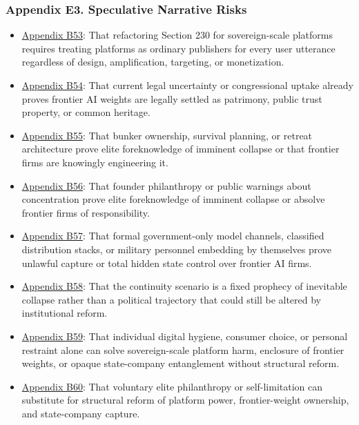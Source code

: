 \documentclass[
  american,
  11pt,
  letterpaper,
]{article}
\providecommand{\tightlist}{%
  \setlength{\itemsep}{0pt}\setlength{\parskip}{0pt}}
\begin{document}
\subsubsection{Appendix E3. Speculative Narrative
Risks}\label{appendix-e3-speculative-narrative-risks}

\begin{itemize}
\tightlist
\item
  \hyperref[appendix-b53-refactoring-section-230-for-sovereign-scale-platforms-requires-treating-platforms]{Appendix
  B53}: That refactoring Section 230 for sovereign-scale platforms
  requires treating platforms as ordinary publishers for every user
  utterance regardless of design, amplification, targeting, or
  monetization.
\item
  \hyperref[appendix-b54-current-legal-uncertainty-or-congressional-uptake-already-proves-frontier-ai-weig]{Appendix
  B54}: That current legal uncertainty or congressional uptake already
  proves frontier AI weights are legally settled as patrimony, public
  trust property, or common heritage.
\item
  \hyperref[appendix-b55-bunker-ownership-survival-planning-or-retreat-architecture-prove-elite-foreknow]{Appendix
  B55}: That bunker ownership, survival planning, or retreat
  architecture prove elite foreknowledge of imminent collapse or that
  frontier firms are knowingly engineering it.
\item
  \hyperref[appendix-b56-founder-philanthropy-or-public-warnings-about-concentration-prove-elite-foreknowl]{Appendix
  B56}: That founder philanthropy or public warnings about concentration
  prove elite foreknowledge of imminent collapse or absolve frontier
  firms of responsibility.
\item
  \hyperref[appendix-b57-formal-government-only-model-channels-classified-distribution-stacks-or-militar]{Appendix
  B57}: That formal government-only model channels, classified
  distribution stacks, or military personnel embedding by themselves
  prove unlawful capture or total hidden state control over frontier AI
  firms.
\item
  \hyperref[appendix-b58-the-continuity-scenario-is-a-fixed-prophecy-of-inevitable-collapse-rather-than-a]{Appendix
  B58}: That the continuity scenario is a fixed prophecy of inevitable
  collapse rather than a political trajectory that could still be
  altered by institutional reform.
\item
  \hyperref[appendix-b59-individual-digital-hygiene-consumer-choice-or-personal-restraint-alone-can-solv]{Appendix
  B59}: That individual digital hygiene, consumer choice, or personal
  restraint alone can solve sovereign-scale platform harm, enclosure of
  frontier weights, or opaque state-company entanglement without
  structural reform.
\item
  \hyperref[appendix-b60-voluntary-elite-philanthropy-or-self-limitation-can-substitute-for-structural-ref]{Appendix
  B60}: That voluntary elite philanthropy or self-limitation can
  substitute for structural reform of platform power, frontier-weight
  ownership, and state-company capture.
\end{itemize}
\end{document}
